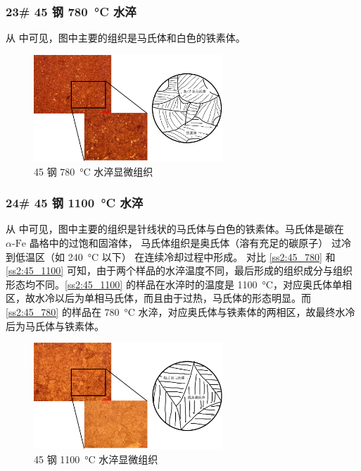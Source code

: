 \documentclass[a4paper,utf8]{article}
\begin{document}
        \subsubsection{23# 45 钢 \SI{780}{\degreeCelsius} 水淬\label{ss2:45_780}}
            从 中可见，图中主要的组织是马氏体和白色的铁素体。
            \begin{figure}[!ht]
                \includegraphics[height=40mm]{result/10.pdf}
                \caption{45 钢 \SI{780}{\degreeCelsius} 水淬显微组织\label{fig:10}}
            \end{figure}

        \subsubsection{24# 45 钢 \SI{1100}{\degreeCelsius} 水淬\label{ss2:45_1100}}
            从 中可见，图中主要的组织是针线状的马氏体与白色的铁素体。马氏体是碳在$\alpha\text{-Fe}$ 晶格中的过饱和固溶体， 马氏体组织是奥氏体（溶有充足的碳原子） 过冷到低温区（如 \SI{240}{\degreeCelsius} 以下） 在连续冷却过程中形成。
            对比 \ref{ss2:45_780} 和 \ref{ss2:45_1100} 可知，由于两个样品的水淬温度不同，最后形成的组织成分与组织形态均不同。\ref{ss2:45_1100} 的样品在水淬时的温度是 \SI{1100}{\degreeCelsius}，对应奥氏体单相区，故水冷以后为单相马氏体，而且由于过热，马氏体的形态明显。而 \ref{ss2:45_780} 的样品在 \SI{780}{\degreeCelsius} 水淬，对应奥氏体与铁素体的两相区，故最终水冷后为马氏体与铁素体。

            \begin{figure}[!ht]
                \includegraphics[height=40mm]{result/11.pdf}
                \caption{45 钢 \SI{1100}{\degreeCelsius} 水淬显微组织\label{fig:11}}
            \end{figure}
\end{document}
